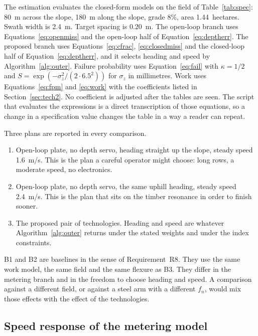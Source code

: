 The estimation evaluates the closed-form models on the field of Table~\ref{tab:spec}: \SI{80}{m} across the slope, \SI{180}{m} along the slope, grade \num{8}\%, area \num{1.44}~hectares. Swath width is \SI{2.4}{m}. Target spacing is \SI{0.20}{m}. The open-loop branch uses Equations~\eqref{eq:openmiss} and the open-loop half of Equation~\eqref{eq:deptherr}. The proposed branch uses Equations~\eqref{eq:cfrac}, \eqref{eq:closedmiss} and the closed-loop half of Equation~\eqref{eq:deptherr}, and it selects heading and speed by Algorithm~\ref{alg:outer}. Failure probability uses Equation~\eqref{eq:fail} with \(\kappa=1/2\) and \(S=\exp(-\sigma_z^2/(2\cdot 6.5^2))\) for \(\sigma_z\) in millimetres. Work uses Equations~\eqref{eq:fpm} and \eqref{eq:work} with the coefficients listed in Section~\ref{sec:tech2}. No coefficient is adjusted after the tables are seen. The script that evaluates the expressions is a direct transcription of those equations, so a change in a specification value changes the table in a way a reader can repeat.

Three plans are reported in every comparison.

\begin{enumerate}[label=\textbf{B\arabic*.}]
\item Open-loop plate, no depth servo, heading straight up the slope, steady speed \SI{1.6}{m/s}. This is the plan a careful operator might choose: long rows, a moderate speed, no electronics.
\item Open-loop plate, no depth servo, the same uphill heading, steady speed \SI{2.4}{m/s}. This is the plan that sits on the timber resonance in order to finish sooner.
\item The proposed pair of technologies. Heading and speed are whatever Algorithm~\ref{alg:outer} returns under the stated weights and under the index constraints.
\end{enumerate}

B1 and B2 are baselines in the sense of Requirement~R8. They use the same work model, the same field and the same flexure as B3. They differ in the metering branch and in the freedom to choose heading and speed. A comparison against a different field, or against a steel arm with a different \(f_n\), would mix those effects with the effect of the technologies.

\subsection{Speed response of the metering model}

